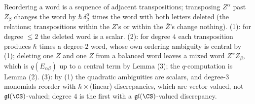 Reordering a word is a sequence of adjacent transpositions; transposing $Z^\alpha$ past $\bar Z_\beta$ changes the word by $\hbar\,\delta^\alpha_\beta$ times the word with both letters deleted (the relations; transpositions within the $Z$'s or within the $\bar Z$'s change nothing). (1): for degree $\le 2$ the deleted word is a scalar. (2): for degree $4$ each transposition produces $\hbar$ times a degree-$2$ word, whose own ordering ambiguity is central by (1); deleting one $Z$ and one $\bar Z$ from a balanced word leaves a mixed word $Z^\alpha\bar Z_\beta$, which is $q(E_{\alpha\beta})$ up to a central term by Lemma (3); the $q$-computation is Lemma (2). (3): by (1) the quadratic ambiguities are scalars, and degree-$3$ monomials reorder with $\hbar\times$(linear) discrepancies, which are vector-valued, not $\mathfrak{gl}(\CS)$-valued; degree $4$ is the first with a $\mathfrak{gl}(\CS)$-valued discrepancy.
